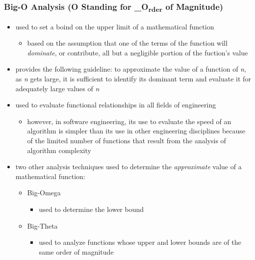 \documentclass[11pt]{article}
\begin{document}
\subsubsection{Big-O Analysis (O Standing for \_O\textsubscript{rder} of Magnitude)}
\label{sec:org4508035}
\begin{itemize}
\item used to set a boind on the upper limit of a mathematical function
\begin{itemize}
\item based on the assumption that one of the terms of the function will \emph{dominate}, or contribute, all but a negligible portion of the fuction's value
\end{itemize}
\item provides the following guideline:
to approximate the value of a function of \emph{n}, as \emph{n} gets large, it is sufficient to identify its dominant term and evaluate it for adequately large values of \emph{n}
\item used to evaluate functional relationships in all fields of engineering
\begin{itemize}
\item however, in software engineering, its use to evaluate the speed of an algorithm is simpler than its use in other engineering disciplines because of the limited number of functions that result from the analysis of algorithm complexity
\end{itemize}
\item two other analysis techniques used to determine the \emph{approximate} value of a mathematical function:
\begin{itemize}
\item Big-Omega
\begin{itemize}
\item used to determine the lower bound
\end{itemize}
\item Big-Theta
\begin{itemize}
\item used to analyze functions whose upper and lower bounds are of the same order of magnitude
\end{itemize}
\end{itemize}
\end{itemize}
\end{document}
